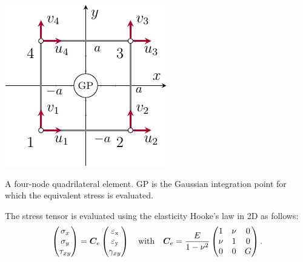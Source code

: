 \begin{marginfigure}
    \centering
    \includegraphics{figures/03_comparison_TO_TTO/03_gauss_point/gp.pdf}
    \caption{A four-node quadrilateral element. GP is the Gaussian integration point for which the equivalent stress is evaluated.}
    \label{fig:03_gp}
\end{marginfigure}


The stress tensor is evaluated using the elasticity Hooke's law in 2D as follows: 
\begin{equation}
    \begin{pmatrix}
    \sigma_x \\
    \sigma_y \\
    \tau_{xy}
    \end{pmatrix}
    =\bm{C}_e
    \begin{pmatrix}
    \varepsilon_\text{x} \\
    \varepsilon_\text{y} \\
    \gamma_{xy}
    \end{pmatrix}
    \quad
    \text{with}
    \quad
    \bm{C}_e = \frac{E}{1-\nu^2}
    \begin{pmatrix}
    1   &   \nu &   0   \\
    \nu &   1   &   0   \\
    0   &   0   &   G
    \end{pmatrix}.
\end{equation}

